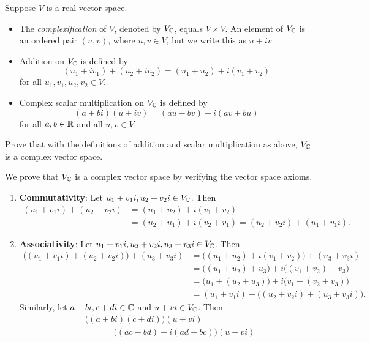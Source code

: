 \begin{exc}
\begin{exercise}
Suppose $V$ is a real vector space.
\begin{itemize}
\item The \emph{complexification} of $V$, denoted by $V_{\mathbb{C}}$, equals
  $V\times V$. An element of $V_{\mathbb{C}}$ is an ordered pair $(u,v)$, where
  $u,v\in V$, but we write this as $u+iv$.
\item Addition on $V_{\mathbb{C}}$ is defined by
  \[ (u_1+iv_1)+(u_2+iv_2) = (u_1+u_2)+i(v_1+v_2) \]
  for all $u_1,v_1,u_2,v_2\in V$.
\item Complex scalar multiplication on $V_{\mathbb{C}}$ is defined by
  \[ (a+bi)(u+iv) = (au-bv)+i(av+bu) \]
  for all $a,b\in\mathbb{R}$ and all $u,v\in V$.
\end{itemize}
Prove that with the definitions of addition and scalar multiplication as
above, $V_{\mathbb{C}}$ is a complex vector space.
\end{exercise}
\begin{solution}
We prove that $V_{\mathbb{C}}$ is a complex vector space by verifying the vector space
axioms.
\begin{enumerate}[label=\arabic*)]
\item \textbf{Commutativity}: Let $u_1+v_1i,u_2+v_2i\in V_{\mathbb{C}}$. Then
  \begin{align*}
  (u_1+v_1i)+(u_2+v_2i) &= (u_1+u_2)+i(v_1+v_2)\\
    &= (u_2+u_1)+i(v_2+v_1) = (u_2+v_2i)+(u_1+v_1i).
  \end{align*}
\item \textbf{Associativity}: Let $u_1+v_1i,u_2+v_2i,u_3+v_3i\in V_{\mathbb{C}}$. Then
  \begin{align*}
  \bigl((u_1+v_1i)+(u_2+v_2i)\bigr)+(u_3+v_3i)
    &= \bigl((u_1+u_2)+i(v_1+v_2)\bigr)+(u_3+v_3i)\\
    &= \bigl((u_1+u_2)+u_3\bigr)+i\bigl((v_1+v_2)+v_3\bigr)\\
    &= \bigl(u_1+(u_2+u_3)\bigr)+i\bigl(v_1+(v_2+v_3)\bigr)\\
    &= (u_1+v_1i)+\bigl((u_2+v_2i)+(u_3+v_3i)\bigr).
  \end{align*}
  Similarly, let $a+bi,c+di\in\mathbb{C}$ and $u+vi\in V_{\mathbb{C}}$. Then
  \begin{align*}
  &\bigl((a+bi)(c+di)\bigr)(u+vi)\\
    &\qquad= \bigl((ac-bd)+i(ad+bc)\bigr)(u+vi)\\

\end{align*}
\end{enumerate}
\end{solution}
\end{exc}
